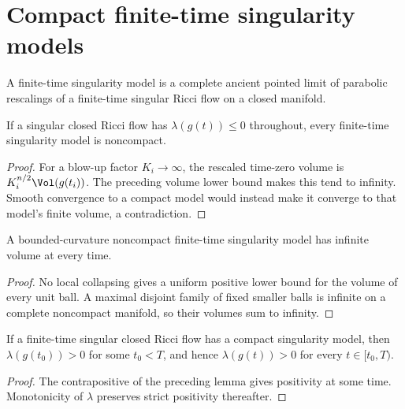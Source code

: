 \section{Compact finite-time singularity models}

\begin{remark}
\label{rem:chow-iii-ch17-singularity-models}
A finite-time singularity model is a complete ancient pointed limit of
parabolic rescalings of a finite-time singular Ricci flow on a closed
manifold.
\end{remark}

\begin{lemma}
\label{lem:chow-iii-ch17-model-noncompact-nonpositive-lambda}
If a singular closed Ricci flow has $\lambda(g(t))\le0$ throughout, every
finite-time singularity model is noncompact.
\end{lemma}
\begin{proof}
\sketch For a blow-up factor $K_i\to\infty$, the rescaled time-zero volume is
$K_i^{n/2}\Vol(g(t_i))$.  The preceding volume lower bound makes this tend
to infinity.  Smooth convergence to a compact model would instead make it
converge to that model's finite volume, a contradiction.
\end{proof}

\begin{remark}
\label{rem:chow-iii-ch17-noncompact-model-infinite-volume}
A bounded-curvature noncompact finite-time singularity model has infinite
volume at every time.
\end{remark}
\begin{proof}
\sketch No local collapsing gives a uniform positive lower bound for the volume of
every unit ball.  A maximal disjoint family of fixed smaller balls is
infinite on a complete noncompact manifold, so their volumes sum to infinity.
\end{proof}

\begin{corollary}
\label{cor:chow-iii-ch17-compact-model-positive-lambda}
If a finite-time singular closed Ricci flow has a compact singularity model,
then $\lambda(g(t_0))>0$ for some $t_0<T$, and hence
$\lambda(g(t))>0$ for every $t\in[t_0,T)$.
\end{corollary}
\begin{proof}
\sketch The contrapositive of the preceding lemma gives positivity at some time.
Monotonicity of $\lambda$ preserves strict positivity thereafter.
\end{proof}

